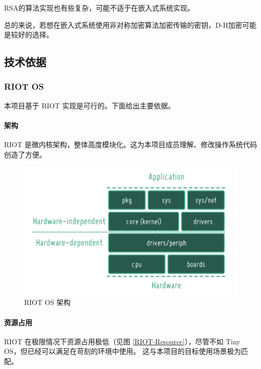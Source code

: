 \documentclass{ctexart}
\begin{document}
RSA的算法实现也有些复杂，可能不适于在嵌入式系统实现。

总的来说，若想在嵌入式系统使用非对称加密算法加密传输的密钥，D-H加密可能是较好的选择。
\subsection{技术依据}
\subsubsection{RIOT OS}
本项目基于 RIOT 实现是可行的。下面给出主要依据。

\paragraph{架构}
RIOT 是微内核架构，整体高度模块化。这为本项目成员理解、修改操作系统代码创造了方便。

\begin{figure}
	\includegraphics[width=\textwidth]{RIOT-Overview.png}
	\caption{RIOT OS 架构}
	\label{RIOT-Overview}
\end{figure}

\paragraph{资源占用}
RIOT 在极限情况下资源占用极低（见图 \ref{RIOT-Resource}），尽管不如 Tiny OS，但已经可以满足在苛刻的环境中使用。
这与本项目的目标使用场景极为匹配。
\end{document}
